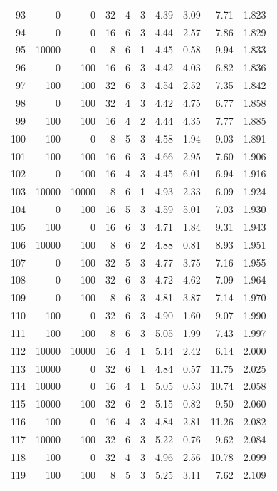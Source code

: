 \begin{footnotesize}
\begin{longtable}{@{}rrrrrrrrrr@{}}
93 & 0 & 0 & 32 & 4 & 3 & 4.39 & 3.09 & 7.71 & 1.823 \\
94 & 0 & 0 & 16 & 6 & 3 & 4.44 & 2.57 & 7.86 & 1.829 \\
95 & 10000 & 0 & 8 & 6 & 1 & 4.45 & 0.58 & 9.94 & 1.833 \\
96 & 0 & 100 & 16 & 6 & 3 & 4.42 & 4.03 & 6.82 & 1.836 \\
97 & 100 & 100 & 32 & 6 & 3 & 4.54 & 2.52 & 7.35 & 1.842 \\
98 & 0 & 100 & 32 & 4 & 3 & 4.42 & 4.75 & 6.77 & 1.858 \\
99 & 100 & 100 & 16 & 4 & 2 & 4.44 & 4.35 & 7.77 & 1.885 \\
100 & 100 & 0 & 8 & 5 & 3 & 4.58 & 1.94 & 9.03 & 1.891 \\
101 & 100 & 100 & 16 & 6 & 3 & 4.66 & 2.95 & 7.60 & 1.906 \\
102 & 0 & 100 & 16 & 4 & 3 & 4.45 & 6.01 & 6.94 & 1.916 \\
103 & 10000 & 10000 & 8 & 6 & 1 & 4.93 & 2.33 & 6.09 & 1.924 \\
104 & 0 & 100 & 16 & 5 & 3 & 4.59 & 5.01 & 7.03 & 1.930 \\
105 & 100 & 0 & 16 & 6 & 3 & 4.71 & 1.84 & 9.31 & 1.943 \\
106 & 10000 & 100 & 8 & 6 & 2 & 4.88 & 0.81 & 8.93 & 1.951 \\
107 & 0 & 100 & 32 & 5 & 3 & 4.77 & 3.75 & 7.16 & 1.955 \\
108 & 0 & 100 & 32 & 6 & 3 & 4.72 & 4.62 & 7.09 & 1.964 \\
109 & 0 & 100 & 8 & 6 & 3 & 4.81 & 3.87 & 7.14 & 1.970 \\
110 & 100 & 0 & 32 & 6 & 3 & 4.90 & 1.60 & 9.07 & 1.990 \\
111 & 100 & 100 & 8 & 6 & 3 & 5.05 & 1.99 & 7.43 & 1.997 \\
112 & 10000 & 10000 & 16 & 4 & 1 & 5.14 & 2.42 & 6.14 & 2.000 \\
113 & 10000 & 0 & 32 & 6 & 1 & 4.84 & 0.57 & 11.75 & 2.025 \\
114 & 10000 & 0 & 16 & 4 & 1 & 5.05 & 0.53 & 10.74 & 2.058 \\
115 & 10000 & 100 & 32 & 6 & 2 & 5.15 & 0.82 & 9.50 & 2.060 \\
116 & 100 & 0 & 16 & 4 & 3 & 4.84 & 2.81 & 11.26 & 2.082 \\
117 & 10000 & 100 & 32 & 6 & 3 & 5.22 & 0.76 & 9.62 & 2.084 \\
118 & 100 & 0 & 32 & 4 & 3 & 4.96 & 2.56 & 10.78 & 2.099 \\
119 & 100 & 100 & 8 & 5 & 3 & 5.25 & 3.11 & 7.62 & 2.109 \\

\end{longtable}
\end{footnotesize}
